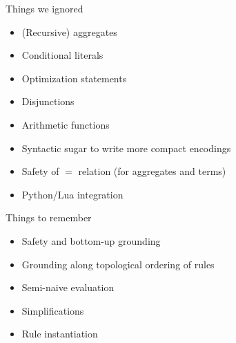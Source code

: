 \begin{frame}{Things we ignored}
  \bigskip
  \begin{itemize}
  \item (Recursive) aggregates
  \item Conditional literals
  \item Optimization statements
  \item Disjunctions
  \item Arithmetic functions
  \item Syntactic sugar to write more compact encodings
  \item Safety of \(=\) relation (for aggregates and terms)
  \item Python/Lua integration
  \end{itemize}
\end{frame}
\begin{frame}{Things to remember}
  \bigskip
  \begin{itemize}
  \item Safety and bottom-up grounding
  \item Grounding along topological ordering of rules
  \item Semi-naive evaluation
  \item Simplifications
  \item Rule instantiation
  \end{itemize}
\end{frame}
%
